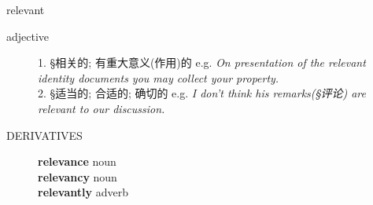 \documentclass[avery5372, grid]{flashcards}
\begin{document}
\begin{flashcard}[{\B 7 Habits} {\S 词汇}]{\Huge relevant}
\begin{description}
		\item[adjective] %
						
			
			1. {\S 相关的; 有重大意义(作用)的} e.g. \textit{On presentation of the relevant identity documents you may collect your property.}\\
			
			2. {\S 适当的; 合适的; 确切的} e.g. \textit{I don't think his remarks\textnormal{({\S 评论})} are relevant to our discussion.}\\
			
			
			
			
			
			
		\item[\textsc{DERIVATIVES}] \textbf{rel\textbullet e\textbullet vance} noun\\
			\textbf{rel\textbullet e\textbullet van\textbullet cy} noun\\
			\textbf{rel\textbullet e\textbullet vant\textbullet ly} adverb
	\end{description}
\end{flashcard}
\end{document}
